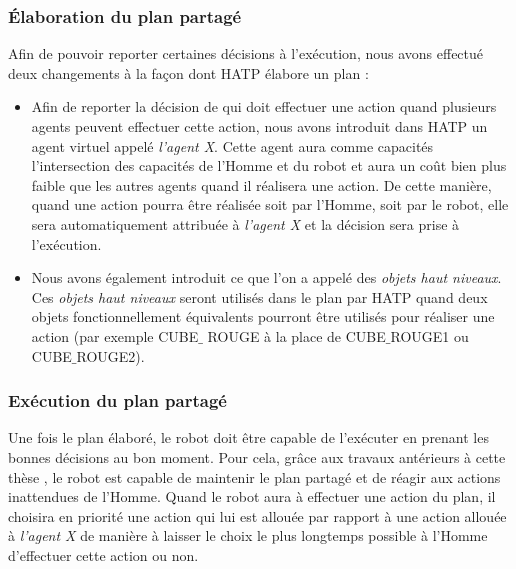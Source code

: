 \documentclass[english,a4paper,11pt,twoside]{StyleThese}
\begin{document}
\subsubsection{Élaboration du plan partagé}

Afin de pouvoir reporter certaines décisions à l'exécution, nous avons effectué deux changements à la façon dont HATP élabore un plan :
\begin{itemize}
\item Afin de reporter la décision de qui doit effectuer une action quand plusieurs agents peuvent effectuer cette action, nous avons introduit dans HATP un agent virtuel appelé \textit{l'agent X}. Cette agent aura comme capacités l'intersection des capacités de l'Homme et du robot et aura un coût bien plus faible que les autres agents quand il réalisera une action. De cette manière, quand une action pourra être réalisée soit par l'Homme, soit par le robot, elle sera automatiquement attribuée à \textit{l'agent X} et la décision sera prise à l'exécution.
\item Nous avons également introduit ce que l'on a appelé des \textit{objets haut niveaux}. Ces \textit{objets haut niveaux} seront utilisés dans le plan par HATP quand deux objets fonctionnellement équivalents pourront être utilisés pour réaliser une action (par exemple CUBE$\_$ ROUGE à la place de CUBE$\_$ROUGE1 ou CUBE$\_$ROUGE2). 
\end{itemize}

\subsubsection{Exécution du plan partagé}

Une fois le plan élaboré, le robot doit être capable de l'exécuter en prenant les bonnes décisions au bon moment. Pour cela, grâce aux travaux antérieurs à cette thèse \cite{fiore2014planning}, le robot est capable de maintenir le plan partagé et de réagir aux actions inattendues de l'Homme. Quand le robot aura à effectuer une action du plan, il choisira en priorité une action qui lui est allouée par rapport à une action allouée à \textit{l'agent X} de manière à laisser le choix le plus longtemps possible à l'Homme d'effectuer cette action ou non. 
\end{document}
